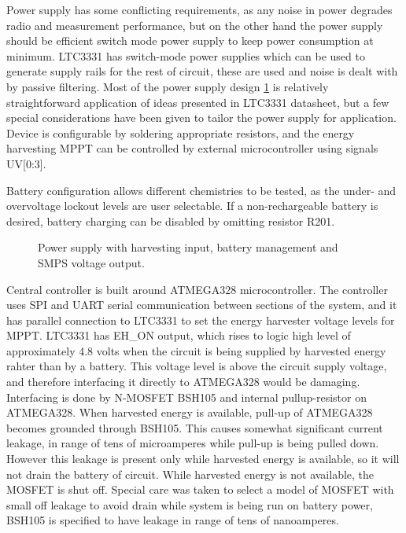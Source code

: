 Power supply has some conflicting requirements, as any noise in power degrades radio and measurement performance, but on the other hand the power supply should be efficient switch mode power supply to keep power consumption at minimum. LTC3331 has switch-mode power supplies which can be used to generate supply rails for the rest of circuit, these are used and noise is dealt with by passive filtering. Most of the power supply design \ref{fig:psu_circuit} is relatively straightforward application of ideas presented in LTC3331 datasheet, but a few special considerations have been given to tailor the power supply for application. Device is configurable by soldering appropriate resistors, and the energy harvesting MPPT can be controlled by external microcontroller using signals UV[0:3]. 

Battery configuration allows different chemistries to be tested, as the under- and overvoltage lockout levels are user selectable. If a non-rechargeable battery is desired, battery charging can be disabled by omitting resistor R201. 

\begin{figure}
    \centering
    \def\svgwidth{\columnwidth}
    
    \caption{\label{fig:psu_circuit} Power supply with harvesting input, battery management and SMPS voltage output.}
\end{figure}

Central controller is built around ATMEGA328 \cite{atmega328} microcontroller. The controller uses SPI and UART serial communication between sections of the system, and it has parallel connection to LTC3331 to set the energy harvester voltage levels for MPPT. LTC3331 has EH\_ON output, which rises to logic high level of approximately 4.8 volts when the circuit is being supplied by harvested energy rahter than by a battery. This voltage level is above the circuit supply voltage, and therefore interfacing it directly to ATMEGA328 would be damaging. Interfacing is done by N-MOSFET BSH105 \cite{BSH105} and internal pullup-resistor on ATMEGA328. When harvested energy is available, pull-up of ATMEGA328 becomes grounded through BSH105. This causes somewhat significant current leakage, in range of tens of microamperes while pull-up is being pulled down. However this leakage is present only while harvested energy is available, so it will not drain the battery of circuit. While harvested energy is not available, the MOSFET is shut off. Special care was taken to select a model of MOSFET with small off leakage to avoid drain while system is being run on battery power, BSH105 is specified to have leakage in range of tens of nanoamperes. 

